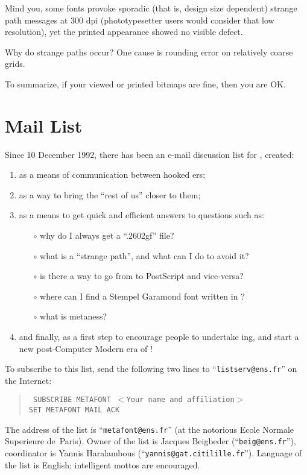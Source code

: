 Mind you, some fonts provoke sporadic
(that is, design size dependent)
strange path messages at 300 dpi
(phototypesetter users would consider that low resolution),
yet the printed appearance showed no visible defect.

Why do strange paths occur?
One cause is rounding error on relatively coarse grids.

To summarize, if your viewed or printed bitmaps are fine,
then you are OK.


\section{\MF{} Mail List}

Since 10 December 1992, there has been an e-mail discussion list
for \MF{}, created:

\begin{enumerate}
\item  as a means of communication between hooked \MF{}ers;

\item  as a way to bring the ``rest of us'' closer to them;

\item  as a means to get quick and efficient answers to questions
       such as:

\begin{itemize}
    \item[$\circ$]  why do I always get a ``.2602gf'' file?
    \item[$\circ$]  what is a ``strange path'',
                  and what can I do to avoid it?
    \item[$\circ$]  is there a way to go from \MF{} to PostScript
                  and vice-versa?
    \item[$\circ$]  where can I find a Stempel Garamond font
                  written in \MF{}?
    \item[$\circ$]  what is metaness?
\end{itemize}

\item  and finally, as a first step to encourage people to undertake
    \MF{}ing, and start a new post-Computer Modern era of \MF{}!
\end{enumerate}

To subscribe to this list, send the following two lines to
``{\tt listserv@ens.fr}'' on the Internet:
  \begin{quote}
    \tt
    SUBSCRIBE METAFONT $<$Your name and affiliation$>$\\
    SET METAFONT MAIL ACK
  \end{quote}
The address of the list is ``{\tt metafont@ens.fr}''
(at the notorious Ecole Normale Superieure de~Paris).
Owner of the list is Jacques {\sc Beigbeder}
(``{\tt beig@ens.fr}''),
coordinator is Yannis {\sc Haralambous}
(``{\tt yannis@gat.citilille.fr}'').
Language of the list is English;
intelligent mottos are encouraged.


